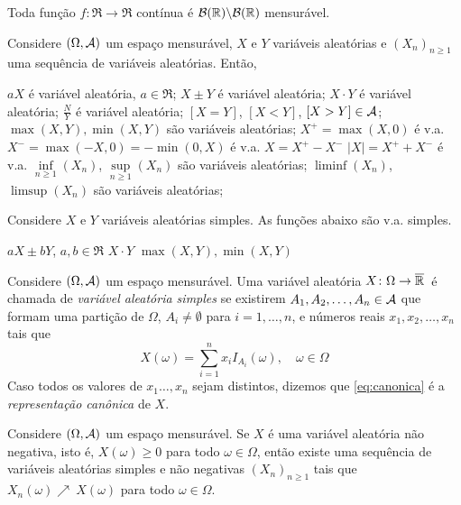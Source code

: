 \begin{lemma}
	Toda função  $f\colon \Re\to \Re$ contínua é $\mathcal{B}(\mathbb{R})\backslash\mathcal{B}(\mathbb{R})$ mensurável.
\end{lemma}

\begin{theorem}
	Considere $(\Omega, \mathcal{A})$ um espaço mensurável, $X$ e $Y$ variáveis aleatórias e $(X_n)_{n\geq1}$ uma sequência de variáveis aleatórias. Então,
	\begin{outline}[enumerate]
		\1 $aX$ é variável aleatória, $a \in \Re$;
		\1 $X\pm Y$ é variável aleatória;
		\1 $X\cdot Y$ é variável aleatória;
		\1 $\frac{N}{Y}$ é variável aleatória;
		\1 $[X=Y]$, $[X<Y]$, $[X>Y] \in \mathcal{A}$;
		\1 $\max(X,Y), \min(X,Y)$ são variáveis aleatórias;
			\2 \(X^+ = \max(X, 0) \) é v.a.
			\2 \(X^- = \max(-X, 0) = -\min(0,X) \) é v.a.
			\2 $X = X^+ - X^-$
			\2 $|X| = X^+ + X^-$ é v.a.
		\1 $\inf\limits_{n\geq1}(X_n)$, $\sup\limits_{n\geq1}(X_n)$ são variáveis aleatórias;
		\1 $\liminf(X_n)$, $\limsup(X_n)$ são variáveis aleatórias;
	\end{outline}
\end{theorem}

\begin{theorem}
	Considere $X$ e $Y$ variáveis aleatórias simples. As funções abaixo são v.a. simples.
	\begin{outline}[enumerate]
		\1 $aX\pm bY$, $a,b \in \Re$
		\1 $X\cdot Y$
		\1 $\max(X,Y), \min(X,Y)$
	\end{outline}
\end{theorem}

\begin{definition}
	Considere $(\Omega, \mathcal{A})$ um espaço mensurável. Uma variável aleatória $X\colon\Omega \to \Ree$ é chamada de \textit{variável aleatória simples} se existirem \(A_1, A_2, \ldots, A_n \in \mathcal{A}\) que formam uma partição de $\Omega$, $A_i\neq\emptyset$ para $i=1,\ldots,n$, e números reais \(x_1, x_2, \ldots, x_n\) tais que
	\begin{equation}\label{eq:canonica}
		X(\omega) = \sum_{i=1}^{n}x_i I_{A_i}(\omega), \quad \omega \in \Omega
	\end{equation}
	Caso todos os valores de $x_1\ldots,x_n$ sejam distintos, dizemos que \ref{eq:canonica} é a \textit{representação canônica} de $X$.
\end{definition}

\begin{theorem}
	Considere $(\Omega, \mathcal{A})$ um espaço mensurável. Se $X$ é uma variável aleatória não negativa, isto é, $X(\omega)\geq0$ para todo $\omega\in\Omega$, então existe uma sequência de variáveis aleatórias simples e não negativas $(X_n)_{n\geq1}$ tais que \(X_n(\omega)\nearrow\ X(\omega)\) para todo $\omega\in\Omega$.
\end{theorem}

